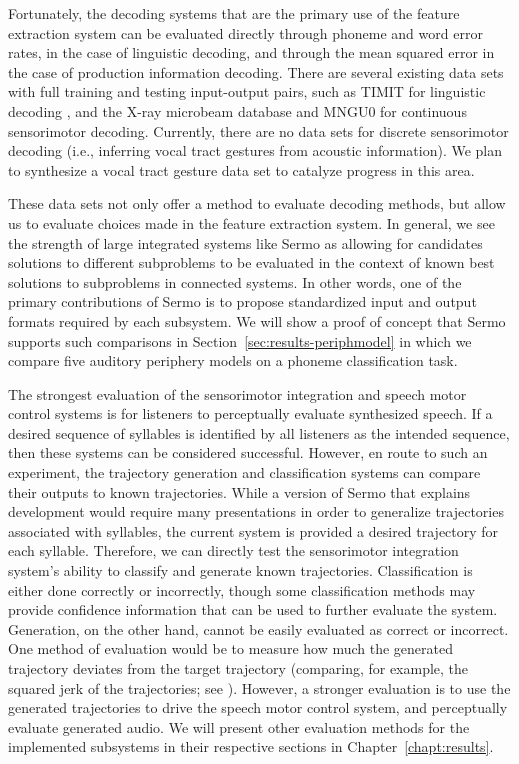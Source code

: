 Fortunately, the decoding systems
that are the primary use
of the feature extraction system
can be evaluated directly
through phoneme and word error rates,
in the case of linguistic decoding,
and through the mean squared error
in the case of production information decoding.
There are several existing data sets
with full training and testing
input-output pairs,
such as TIMIT for linguistic decoding
\citep{garofolo1993},
and the X-ray microbeam database \citep{westbury1990}
and MNGU0 \citep{steiner2012}
for continuous sensorimotor decoding.
Currently, there are no data sets
for discrete sensorimotor decoding
(i.e., inferring vocal tract gestures
from acoustic information).
We plan to synthesize a
vocal tract gesture
data set to catalyze progress
in this area.

These data sets not only offer a method
to evaluate decoding methods,
but allow us to evaluate choices made
in the feature extraction system.
In general, we see the strength
of large integrated systems like Sermo
as allowing for candidates solutions
to different subproblems
to be evaluated in the context of
known best solutions
to subproblems in connected systems.
In other words,
one of the primary contributions of Sermo
is to propose standardized input and output formats
required by each subsystem.
We will show a proof of concept
that Sermo supports such comparisons
in Section~\ref{sec:results-periphmodel}
in which we compare
five auditory periphery models
on a phoneme classification task.

The strongest evaluation
of the sensorimotor integration
and speech motor control systems
is for listeners to perceptually evaluate
synthesized speech.
If a desired sequence of syllables
is identified by all listeners
as the intended sequence,
then these systems can be considered successful.
However, en route to such an experiment,
the trajectory generation and classification systems
can compare their outputs to known trajectories.
While a version of Sermo
that explains development
would require many presentations
in order to generalize trajectories
associated with syllables,
the current system
is provided a desired trajectory
for each syllable.
Therefore, we can directly
test the sensorimotor integration system's
ability to classify
and generate known trajectories.
Classification is either done
correctly or incorrectly,
though some classification methods
may provide confidence information
that can be used to further evaluate the system.
Generation, on the other hand,
cannot be easily evaluated
as correct or incorrect.
One method of evaluation would be to
measure how much the generated trajectory
deviates from the target trajectory
(comparing, for example,
the squared jerk of the trajectories;
see \citealt{hogan2009}).
However, a stronger evaluation
is to use the generated trajectories
to drive the speech motor control system,
and perceptually evaluate generated audio.
We will present other evaluation methods
for the implemented subsystems
in their respective sections
in Chapter~\ref{chapt:results}.

